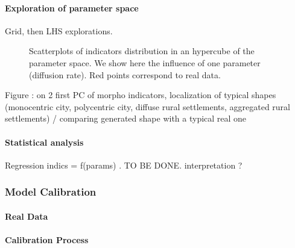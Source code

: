 \paragraph{Exploration of parameter space}

Grid, then LHS explorations.






\begin{figure}

\caption{Scatterplots of indicators distribution in an hypercube of the parameter space. We show here the influence of one parameter (diffusion rate). Red points correspond to real data.}
\end{figure}


Figure : on 2 first PC of morpho indicators, localization of typical shapes (monocentric city, polycentric city, diffuse rural settlements, aggregated rural settlements) / comparing generated shape with a typical real one

\paragraph{Statistical analysis}

Regression indics = f(params) . TO BE DONE.
interpretation ?

\subsubsection{Model Calibration}

\paragraph{Real Data}








\paragraph{Calibration Process}

